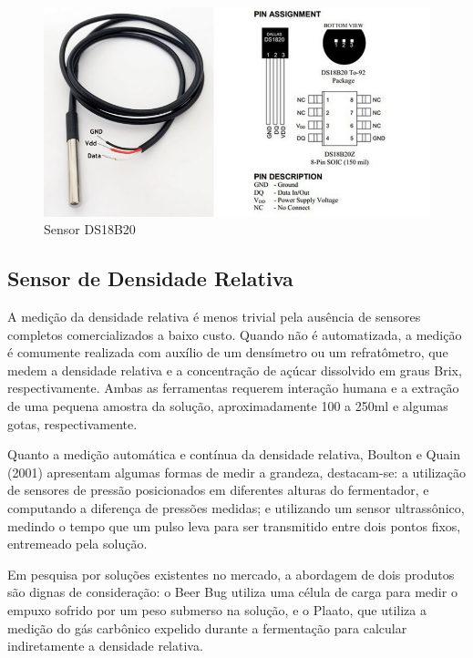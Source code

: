 \begin{figure}[h]
    \centering
    \includegraphics[scale=0.50]{figuras/projeto/hardware/ds18b20.jpg}
    \caption{Sensor DS18B20}
    \label{fig:ds18b20}
\end{figure}

\subsection{Sensor de Densidade Relativa}

A medição da densidade relativa é menos trivial pela ausência de sensores completos comercializados a baixo custo. Quando não é automatizada, a medição é comumente  realizada com auxílio de um densímetro ou um refratômetro, que medem a densidade relativa e a concentração de açúcar dissolvido em graus Brix, respectivamente. Ambas as ferramentas requerem interação humana e a extração de uma pequena amostra da solução, aproximadamente 100 a 250ml e algumas gotas, respectivamente.


Quanto a medição automática e contínua da densidade relativa, Boulton e Quain (2001) apresentam algumas formas de medir a grandeza, destacam-se: a utilização de sensores de pressão posicionados em diferentes alturas do fermentador, e computando a diferença de pressões medidas; e utilizando um sensor ultrassônico,  medindo o tempo que um pulso leva para ser transmitido entre dois pontos fixos, entremeado pela solução. 


Em pesquisa por soluções existentes no mercado, a abordagem de dois produtos são dignas de consideração: o Beer Bug utiliza uma célula de carga para medir o empuxo sofrido por um peso submerso na solução, e o Plaato, que utiliza a medição do gás carbônico expelido durante a fermentação para calcular indiretamente a densidade relativa.


